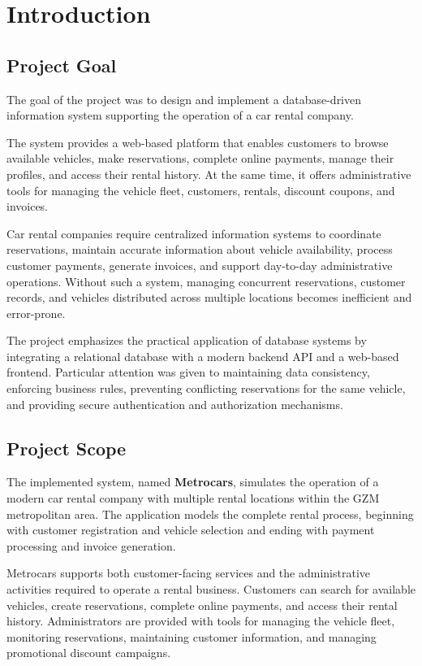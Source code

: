 \pagebreak
\section{Introduction}

\subsection{Project Goal}

The goal of the project was to design and implement a database-driven information system supporting the operation of a car rental company.

The system provides a web-based platform that enables customers to browse available vehicles, make reservations, complete online payments, manage their profiles, and access their rental history. At the same time, it offers administrative tools for managing the vehicle fleet, customers, rentals, discount coupons, and invoices.

Car rental companies require centralized information systems to coordinate reservations, maintain accurate information about vehicle availability, process customer payments, generate invoices, and support day-to-day administrative operations. Without such a system, managing concurrent reservations, customer records, and vehicles distributed across multiple locations becomes inefficient and error-prone.

The project emphasizes the practical application of database systems by integrating a relational database with a modern backend API and a web-based frontend. Particular attention was given to maintaining data consistency, enforcing business rules, preventing conflicting reservations for the same vehicle, and providing secure authentication and authorization mechanisms.

\subsection{Project Scope}

The implemented system, named \textbf{Metrocars}, simulates the operation of a modern car rental company with multiple rental locations within the GZM metropolitan area. The application models the complete rental process, beginning with customer registration and vehicle selection and ending with payment processing and invoice generation.

Metrocars supports both customer-facing services and the administrative activities required to operate a rental business. Customers can search for available vehicles, create reservations, complete online payments, and access their rental history. Administrators are provided with tools for managing the vehicle fleet, monitoring reservations, maintaining customer information, and managing promotional discount campaigns.

